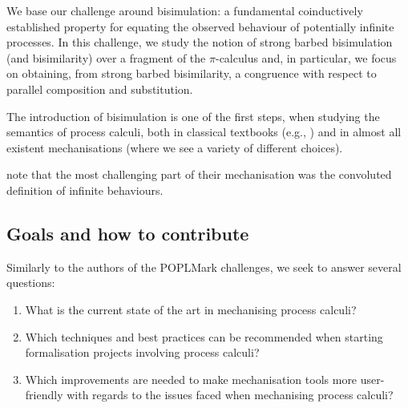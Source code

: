\documentclass[runningheads]{llncs}
\begin{document}
We base our challenge around
bisimulation: a fundamental coinductively established property for equating the
observed behaviour of potentially infinite processes. 
In this challenge, we study the notion of strong barbed bisimulation
(and bisimilarity)
over a fragment of the $\pi$-calculus and,
in particular, we focus on obtaining,
from strong barbed bisimilarity,
a congruence with respect to
parallel composition and substitution.

The introduction of bisimulation
is one of the first steps, when studying the
semantics of process calculi, both
in classical textbooks (e.g., \cite{})
and in almost all existent 
mechanisations \cite{}
(where we see a variety
of different choices).


\cite{Castro-Perez2021} note that the most challenging part of their mechanisation was the convoluted definition of infinite behaviours.





\subsection{Goals and how to contribute}
Similarly to the authors of the POPLMark challenges, we seek to
answer several questions:
\begin{enumerate}[label=\textbf{(Q\arabic*)},leftmargin=10mm]
\item\label{item:rq1} What is the current state of the art in mechanising process calculi?
\item\label{item:rq2} Which techniques and best practices can be recommended when starting formalisation projects involving process calculi?
\item\label{item:rq3} Which improvements are needed to make mechanisation tools more user-friendly with regards to the issues faced when mechanising process calculi?
\end{enumerate}
\end{document}
